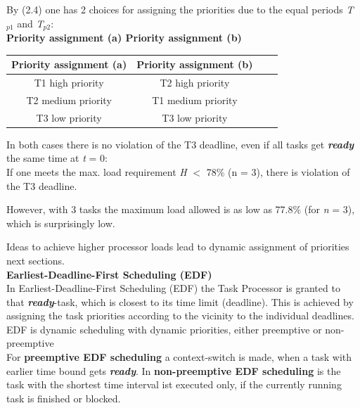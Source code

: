 By (2.4) one has 2 choices for assigning the priorities due to the equal periods \textit{T}${}_{p1}$\textit{ }and \textit{T}${}_{p2}$:\\

\textbf{Priority assignment (a)   Priority assignment (b)}

\begin{table}[h!]
\setlength{\tabcolsep}{10pt} %
\renewcommand{\arraystretch}{1.5} %
\small
\centering
 \begin{tabular}{|c|c|c|c|} 
 \hline
 \textbf{Priority assignment (a)} & \textbf{Priority assignment (b)} \\ [0.1ex] 
 \hline
 T1  high priority & T2  high  priority \\ 
 \hline
 T2  medium priority & T1  medium priority \\ 
  \hline
 T3  low priority & T3  low priority  \\ 
 \hline
 \end{tabular}
 \label{Intrinsic}
\end{table}

In both cases there is no violation of the T3 deadline, even if all tasks get \textbf{\textit{ready}} the same time at \textit{t} = 0: \\

If one meets the max. load requirement \textit{H} $\mathrm{<}$ 78\% (n = 3), there is violation of the T3 deadline.

However, with 3 tasks the maximum load allowed is as low as 77.8\% (for \textit{n} = 3), which is surprisingly low.

Ideas to achieve higher processor loads lead to dynamic assignment of priorities  next sections.\\

{\rot\bf Earliest-Deadline-First Scheduling (EDF)}\\

In Earliest-Deadline-First Scheduling (EDF) the Task Processor is granted to that \textbf{\textit{ready}}-task, which is closest to its time limit (deadline). This is achieved by assigning the task priorities according to the vicinity to the individual deadlines.\\

EDF is dynamic scheduling with dynamic priorities, either preemptive or non-preemptive\\

For \textbf{preemptive EDF scheduling} a context-switch is made, when a task with earlier time bound gets \textbf{\textit{ready}}. In \textbf{non-preemptive EDF scheduling} is the task with the shortest time interval ist executed only, if the currently running task is finished or blocked.\\

